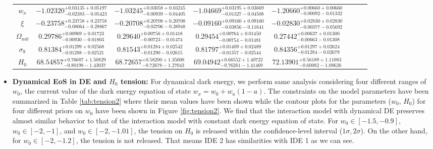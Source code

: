 \documentclass[superscriptaddress,oneolumn,secnumarabic,
amssymb,amsmath,nobibnotes,aps,prd,showpacs,nofootinbib]{revtex4}%
\begin{document}
\begin{itemize}
\begin{table}
\begin{tabular}{cccccccc}
$w_x$ &  $   -1.02320_{-    0.02383-    0.05423}^{+    0.03135+    0.05197}$ & $   -1.03245_{-    0.00939-    0.04405}^{+    0.03058+    0.03245}$ & $-1.04669_{-    0.01327-    0.04508}^{+    0.03195+    0.03669}$ &$   -1.20660_{-    0.00092-    0.01332}^{+    0.00660+    0.00660}$\\


$\xi$ & $   -0.23758_{-    0.08064-    0.28867}^{+    0.23758+    0.23758}$ & $   -0.20708_{-    0.03706-    0.38948}^{+    0.20708+    0.20708}$ & $-0.09160_{-    0.03856-    0.11641}^{+    0.09160+    0.09160}$ &$   -0.02830_{-    0.00377-    0.05692}^{+    0.02830+    0.02830}$\\


$\Omega_{m0}$ & $    0.29786_{-    0.00930-    0.01803}^{+    0.00969+    0.01723}$ & $    0.29640_{-    0.00723-    0.01474}^{+    0.00756+    0.01418}$ & $0.29454_{-    0.00754-    0.01481}^{+    0.00764+    0.01450}$ &$    0.27442_{-    0.00663-    0.01308}^{+    0.00637+    0.01300}$\\


$\sigma_8$ & $    0.81384_{-    0.01288-    0.02521}^{+    0.01299+    0.02568}$ & $    0.81543_{-    0.01290-    0.02615}^{+    0.01284+    0.02542}$ & $0.81797_{-    0.01357-    0.02544}^{+    0.01409+    0.02489}$ & $ 0.84356_{-    0.01284-    0.02679}^{+    0.01297+    0.02624}$\\


$H_0$ &  $   68.54857_{-    0.80198-    1.43037}^{+    0.76687+    1.50829}$ & $   68.72657_{-    0.72678-    1.27043}^{+    0.58200+    1.35008}$ & $69.04942_{-    0.76261-    1.41469}^{+    0.66552+    1.40722}$ &$   72.13901_{-    0.60082-    1.08626}^{+    0.56189+    1.11083}$\\
\hline
\end{tabular}%
\label{tab:tension1}
\end{table}


\item \textbf{Dynamical EoS in DE and $H_0$ tension:} For dynamical dark energy, we perform same analysis considering four different ranges of $w_0$, the current value of the dark energy equation of state $w_{x} = w_0 + w_a (1-a)$. The constraints on the model parameters have been summarized in Table \ref{tab:tension2} where their mean values have been shown while the contour plots for the parameters ($w_0$, $H_0$) for four different priors on $w_0$ have been shown in Figure \ref{fig:tension2}. We find that the interaction model with dynamical DE preserves almost similar behavior to that of the interaction model with constant dark energy equation of state. For  $w_0 \in [-1.5,-0.9]$, $w_0 \in [-2, -1]$, and $w_0 \in [-2, -1.01]$, the tension on $H_0$ is released within the confidence-level interval ($1\sigma, 2 \sigma$).  On the other hand, for $w_0 \in [-2, -1.2]$, the tension is not released. That means IDE 2 has similarities with IDE 1 as we can see.



\end{itemize}
\end{document}
